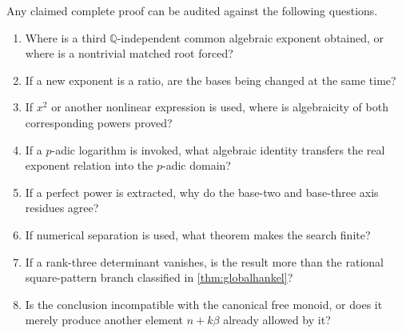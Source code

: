 \documentclass[11pt]{article}
\numberwithin{equation}{section}
\theoremstyle{definition}
\newcommand{\Q}{\mathbb{Q}}
\begin{document}
Any claimed complete proof can be audited against the following questions.
\begin{enumerate}
\item Where is a third \(\Q\)-independent common algebraic exponent obtained, or where is a nontrivial matched root forced?
\item If a new exponent is a ratio, are the bases being changed at the same time?
\item If \(x^2\) or another nonlinear expression is used, where is algebraicity of both corresponding powers proved?
\item If a \(p\)-adic logarithm is invoked, what algebraic identity transfers the real exponent relation into the \(p\)-adic domain?
\item If a perfect power is extracted, why do the base-two and base-three axis residues agree?
\item If numerical separation is used, what theorem makes the search finite?
\item If a rank-three determinant vanishes, is the result more than the rational square-pattern branch classified in \cref{thm:globalhankel}?
\item Is the conclusion incompatible with the canonical free monoid, or does it merely produce another element \(n+k\beta\) already allowed by it?
\end{enumerate}
\end{document}
